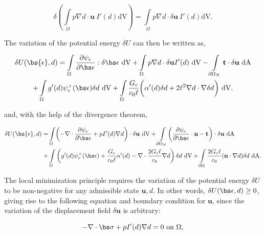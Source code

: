 \begin{equation}\label{dry variation}
    \delta \left( \int\limits_{\Omega} p \nabla d\cdot\textbf{u}\ I'(d)\text{dV} \right) = \int\limits_{\Omega} p \nabla d\cdot\delta\textbf{u}\ I'(d)\text{dV}.
\end{equation}

\noindent The variation of the potential energy $\delta U$ can then be written as,

\begin{multline}
    \delta U(\bs{\epsilon},d) = \int\limits_{\Omega}\dfrac{\partial\psi_e}{\partial \bs \epsilon}:\delta\bs\epsilon\ \text{dV} + \int\limits_{\Omega} p \nabla d\cdot\delta\textbf{u}I'(d)\ \text{dV} 
    - \int\limits_{\partial \Omega_N} \textbf{t}\cdot\delta\textbf{u} \ \text{dA} \\
    + \int\limits_{\Omega}g'(d) \psi_e^+(\bs\epsilon)\delta d\ \text{dV}
    + \int\limits_{\Omega}\dfrac{G_c}{c_0\ell}\bigg( \alpha'(d)\delta d + 2\ell^2\nabla d \cdot \nabla \delta d\bigg)\ \text{dV},
\end{multline}

and, with the help of the divergence theorem, 

\begin{align}
    \delta U(\bs{\epsilon},d) =& \int\limits_{\Omega}\biggl(-\nabla \cdot \dfrac{\partial\psi_e}{\partial \bs \epsilon} + pI'(d) \nabla d\biggr)\cdot\delta\textbf{u}\ \text{dV} 
    + \int\limits_{\partial \Omega_N}\biggl( \dfrac{\partial\psi_e}{\partial \bs \epsilon}\cdot\textbf{n}  -\textbf{t}\biggr)\cdot\delta\textbf{u} \ \text{dA} \\
    +& \int\limits_{\Omega}\left(g'(d) \psi_e^+(\bs\epsilon)
    + \dfrac{G_c}{c_0\ell}\alpha'(d) - \nabla \cdot\dfrac{2G_c\ell}{c_0}\nabla d \right)\delta d\ \text{dV} + \int\limits_{\partial\Omega} \dfrac{2G_c\ell}{c_0}(\textbf{n}\cdot\nabla d)  \delta d\ \text{dA}.
\end{align}

The local minimization principle requires the variation of the potential energy $\delta U$ to be non-negative for any admissible state $\textbf{u},d$. In other words, $\delta U(\bs\epsilon, d) \ge 0$, giving rise to the following equation and boundary condition for $\textbf{u}$, since the variation of the displacement field $\delta \textbf{u}$ is arbitrary:

\begin{equation}\label{disp equation}
    -\nabla \cdot \bs \sigma  + pI'(d) \nabla d = 0 \text{ on }\Omega,
\end{equation}

